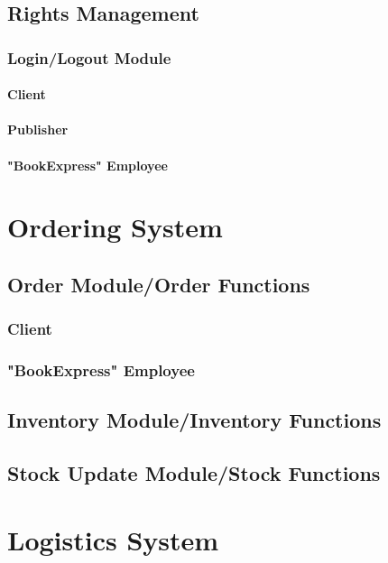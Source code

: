 \documentclass[11pt,a4paper,oneside,svgnames]{report}
\begin{document}
\subsection{Rights Management}

\subsubsection{Login/Logout Module}
\paragraph{Client}
\paragraph{Publisher}
\paragraph{"BookExpress" Employee}


\section{Ordering System}

\subsection{Order Module/Order Functions}
\subsubsection{Client}
\subsubsection{"BookExpress" Employee}

\subsection{Inventory Module/Inventory Functions}

\subsection{Stock Update Module/Stock Functions}

\section{Logistics System}
\end{document}
